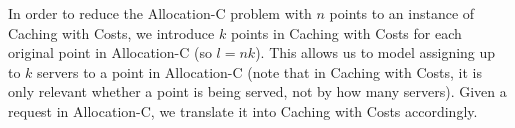 In order to reduce the Allocation-C problem with $n$ points to an instance of Caching with Costs, we introduce $k$ points in Caching with Costs for each original point in Allocation-C (so $l = nk$).
This allows us to model assigning up to $k$ servers to a point in Allocation-C (note that in Caching with Costs, it is only relevant whether a point is being served, not by how many servers).
Given a request in Allocation-C, we translate it into Caching with Costs accordingly.
